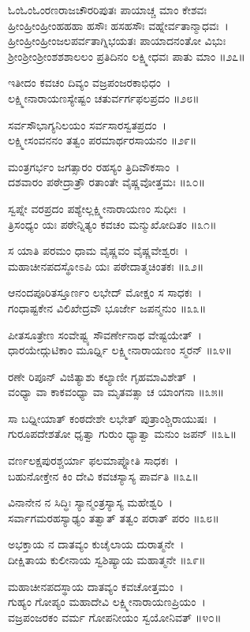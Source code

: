 ಓಂಓಂಓಂರಣರಾಜಚೌರರಿಪುತಃ ಪಾಯಾಚ್ಚ ಮಾಂ ಕೇಶವಃ\\
ಹ್ರೀಂಹ್ರೀಂಹ್ರೀಂಹಹಹಾ ಹಸೌಃ ಹಸಹಸೌಃ ವಹ್ನೇರ್ವತಾನ್ಮಾಧವಃ~।\\
ಹ್ರೀಂಹ್ರೀಂಹ್ರೀಂಜಲಪರ್ವತಾಗ್ನಿಭಯತಃ ಪಾಯಾದನಂತೋ ವಿಭುಃ\\
ಶ್ರೀಂಶ್ರೀಂಶ್ರೀಂಶಶಶಾಲಲಂ ಪ್ರತಿದಿನಂ ಲಕ್ಷ್ಮೀಧವಃ ಪಾತು ಮಾಂ ॥೨೭॥

ಇತೀದಂ ಕವಚಂ ದಿವ್ಯಂ ವಜ್ರಪಂಜರಕಾಭಿಧಂ~।\\
ಲಕ್ಷ್ಮೀನಾರಾಯಣಸ್ಯೇಷ್ಟಂ ಚತುರ್ವರ್ಗಫಲಪ್ರದಂ ॥೨೮॥

ಸರ್ವಸೌಭಾಗ್ಯನಿಲಯಂ ಸರ್ವಸಾರಸ್ವತಪ್ರದಂ~।\\
ಲಕ್ಷ್ಮೀಸಂವನನಂ ತತ್ವಂ ಪರಮಾರ್ಥರಸಾಯನಂ ॥೨೯॥

ಮಂತ್ರಗರ್ಭಂ ಜಗತ್ಸಾರಂ ರಹಸ್ಯಂ ತ್ರಿದಿವೌಕಸಾಂ~।\\
ದಶವಾರಂ ಪಠೇದ್ರಾತ್ರೌ ರತಾಂತೇ ವೈಷ್ಣವೋತ್ತಮಃ ॥೩೦॥

ಸ್ವಪ್ನೇ ವರಪ್ರದಂ ಪಶ್ಯೇಲ್ಲಕ್ಷ್ಮೀನಾರಾಯಣಂ ಸುಧೀಃ~।\\
ತ್ರಿಸಂಧ್ಯಂ ಯಃ ಪಠೇನ್ನಿತ್ಯಂ ಕವಚಂ ಮನ್ಮುಖೋದಿತಂ ॥೩೧॥

ಸ ಯಾತಿ ಪರಮಂ ಧಾಮ ವೈಷ್ಣವಂ ವೈಷ್ಣವೇಶ್ವರಃ~।\\
ಮಹಾಚೀನಪದಸ್ಥೋಽಪಿ ಯಃ ಪಠೇದಾತ್ಮಚಿಂತಕಃ ॥೩೨॥

ಆನಂದಪೂರಿತಸ್ತೂರ್ಣಂ ಲಭೇದ್ ಮೋಕ್ಷಂ ಸ ಸಾಧಕಃ~।\\
ಗಂಧಾಷ್ಟಕೇನ ವಿಲಿಖೇದ್ರವೌ ಭೂರ್ಜೇ ಜಪನ್ಮನುಂ ॥೩೩॥

ಪೀತಸೂತ್ರೇಣ ಸಂವೇಷ್ಟ್ಯ ಸೌವರ್ಣೇನಾಥ ವೇಷ್ಟಯೇತ್~।\\
ಧಾರಯೇದ್ಗುಟಿಕಾಂ ಮೂರ್ಧ್ನಿ ಲಕ್ಷ್ಮೀನಾರಾಯಣಂ ಸ್ಮರನ್ ॥೩೪॥

ರಣೇ ರಿಪೂನ್ ವಿಜಿತ್ಯಾಶು ಕಲ್ಯಾಣೀ ಗೃಹಮಾವಿಶೇತ್~।\\
ವಂಧ್ಯಾ ವಾ ಕಾಕವಂಧ್ಯಾ ವಾ ಮೃತವತ್ಸಾ ಚ ಯಾಂಗನಾ ॥೩೫॥

ಸಾ ಬಧ್ನೀಯಾತ್ ಕಂಠದೇಶೇ ಲಭೇತ್ ಪುತ್ರಾಂಶ್ಚಿರಾಯುಷಃ~।\\
ಗುರೂಪದೇಶತೋ ಧೃತ್ವಾ ಗುರುಂ ಧ್ಯಾತ್ವಾ ಮನುಂ ಜಪನ್ ॥೩೬॥

ವರ್ಣಲಕ್ಷಪುರಶ್ಚರ್ಯಾ ಫಲಮಾಪ್ನೋತಿ ಸಾಧಕಃ~।\\
ಬಹುನೋಕ್ತೇನ ಕಿಂ ದೇವಿ ಕವಚಸ್ಯಾಸ್ಯ ಪಾರ್ವತಿ ॥೩೭॥

ವಿನಾನೇನ ನ ಸಿದ್ಧಿಃ ಸ್ಯಾನ್ಮಂತ್ರಸ್ಯಾಸ್ಯ ಮಹೇಶ್ವರಿ~।\\
ಸರ್ವಾಗಮರಹಸ್ಯಾಢ್ಯಂ ತತ್ವಾತ್ ತತ್ವಂ ಪರಾತ್ ಪರಂ ॥೩೮॥

ಅಭಕ್ತಾಯ ನ ದಾತವ್ಯಂ ಕುಚೈಲಾಯ ದುರಾತ್ಮನೇ~।\\
ದೀಕ್ಷಿತಾಯ ಕುಲೀನಾಯ ಸ್ವಶಿಷ್ಯಾಯ ಮಹಾತ್ಮನೇ ॥೩೯॥

ಮಹಾಚೀನಪದಸ್ಥಾಯ ದಾತವ್ಯಂ ಕವಚೋತ್ತಮಂ~।\\
ಗುಹ್ಯಂ ಗೋಪ್ಯಂ ಮಹಾದೇವಿ ಲಕ್ಷ್ಮೀನಾರಾಯಣಪ್ರಿಯಂ~।\\
ವಜ್ರಪಂಜರಕಂ ವರ್ಮ ಗೋಪನೀಯಂ ಸ್ವಯೋನಿವತ್ ॥೪೦॥
